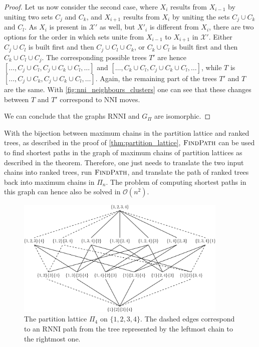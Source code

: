 \documentclass[11pt]{amsart}
\newcommand{\rnni}{\mathrm{RNNI}}
\newcommand{\findpath}{\textsc{FindPath}}
\newcommand{\nni}{\mathrm{NNI}}
\renewcommand{\O}{\mathcal O}
\begin{document}
\begin{proof}
	Let us now consider the second case, where $X_i$ results from $X_{i-1}$ by uniting two sets $C_j$ and $C_k$, and $X_{i+1}$ results from $X_i$ by uniting the sets $C_j \cup C_k$ and $C_l$.
	As $X_i$ is present in $\mathcal X'$ as well, but $X'_i$ is different from $X_i$, there are two options for the order in which sets unite from $X_{i-1}$ to $X_{i+1}$ in $\mathcal X'$.
	Either $C_j \cup C_l$ is built first and then $C_j \cup C_l \cup C_k$, or $C_k \cup C_l$ is built first and then $C_k \cup C_l \cup C_j$.
	The corresponding possible trees $T'$ are hence $[\ldots, C_j \cup C_l, C_j \cup C_k \cup C_l, \ldots]$ and $[\ldots, C_k \cup C_l, C_j \cup C_k \cup C_l, \ldots]$, while $T$ is $[\ldots, C_j \cup C_k, C_j \cup C_k \cup C_l, \ldots]$.
	Again, the remaining part of the trees $T'$ and $T$ are the same.
	With \autoref{fig:nni_neighbours_clusters} one can see that these changes between $T$ and $T'$ correspond to $\nni$ moves.

	We can conclude that the graphs $\rnni$ and $G_\Pi$ are isomorphic.
\end{proof}

With the bijection between maximum chains in the partition lattice and ranked trees, as described in the proof of \autoref{thm:partition_lattice}, $\findpath$ can be used to find shortest paths in the graph of maximum chains of partition lattices as described in the theorem.
Therefore, one just needs to translate the two input chains into ranked trees, run $\findpath$, and translate the path of ranked trees back into maximum chains in $\Pi_n$.
The problem of computing shortest paths in this graph can hence also be solved in $\O(n^2)$.

\begin{figure}[ht]
\centering
\includegraphics[width=0.9\textwidth]{partition_lattice4}
\vspace{12pt}
\caption{The partition lattice $\Pi_4$ on $\{1,2,3,4\}$.
The dashed edges correspond to an $\rnni$ path from the tree represented by the leftmost chain to the rightmost one.}
\label{fig:partition_lattice4}
\end{figure}
\end{document}
